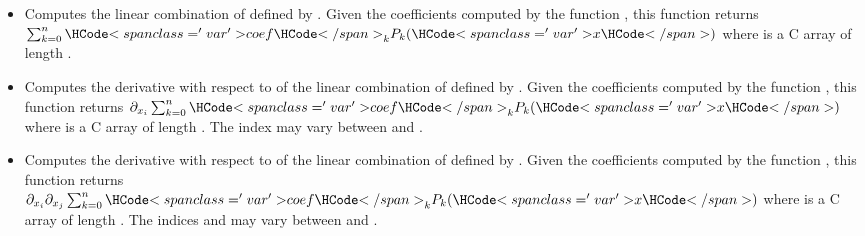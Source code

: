 \begin{itemize}
\item {}
  \sshortdescribe Computes the linear combination of  defined by
  . Given the coefficients computed by the function
  , this function returns $\sum_{k=0}^n
  \var{coef}_k  P_k(\var{x})$ where  is a C array of length
  .

\item {}
  \sshortdescribe Computes the derivative with respect to  of the
  linear combination of  defined by . Given the
  coefficients computed by the function , this
  function returns $\partial_{x_i} \sum_{k=0}^n \var{coef}_k  P_k(\var{x})$
  where  is a C array of length . The index 
  may vary between  and .


\item {}
  \sshortdescribe Computes the derivative with respect to  of the
  linear combination of  defined by . Given the
  coefficients computed by the function , this
  function returns $\partial_{x_i} \partial_{x_j} \sum_{k=0}^n \var{coef}_k  P_k(\var{x})$
  where  is a C array of length . The indices 
  and  may vary between  and .
\end{itemize}



